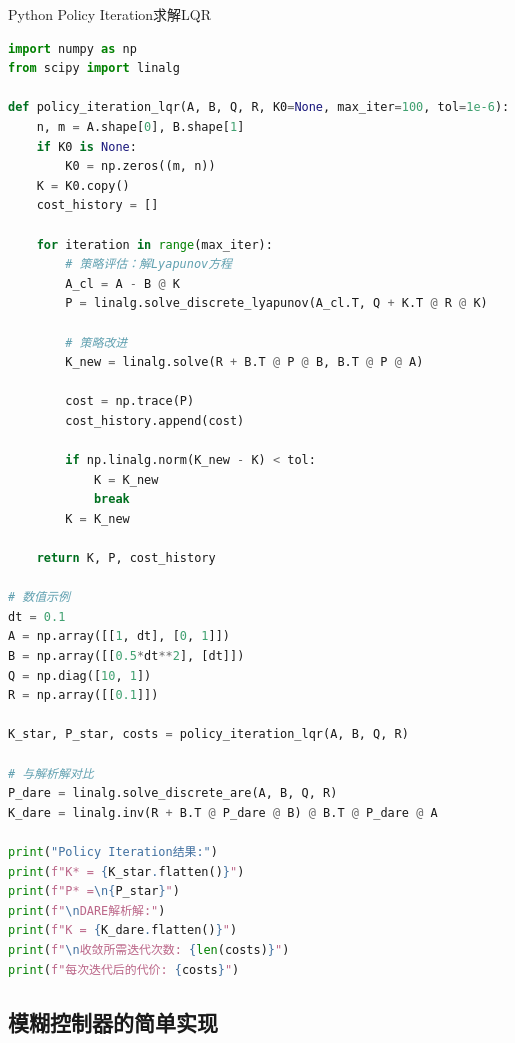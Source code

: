 \begin{mycode}{Python Policy Iteration求解LQR}
\begin{lstlisting}[language=Python]
import numpy as np
from scipy import linalg

def policy_iteration_lqr(A, B, Q, R, K0=None, max_iter=100, tol=1e-6):
    n, m = A.shape[0], B.shape[1]
    if K0 is None:
        K0 = np.zeros((m, n))
    K = K0.copy()
    cost_history = []
    
    for iteration in range(max_iter):
        # 策略评估：解Lyapunov方程
        A_cl = A - B @ K
        P = linalg.solve_discrete_lyapunov(A_cl.T, Q + K.T @ R @ K)
        
        # 策略改进
        K_new = linalg.solve(R + B.T @ P @ B, B.T @ P @ A)
        
        cost = np.trace(P)
        cost_history.append(cost)
        
        if np.linalg.norm(K_new - K) < tol:
            K = K_new
            break
        K = K_new
    
    return K, P, cost_history

# 数值示例
dt = 0.1
A = np.array([[1, dt], [0, 1]])
B = np.array([[0.5*dt**2], [dt]])
Q = np.diag([10, 1])
R = np.array([[0.1]])

K_star, P_star, costs = policy_iteration_lqr(A, B, Q, R)

# 与解析解对比
P_dare = linalg.solve_discrete_are(A, B, Q, R)
K_dare = linalg.inv(R + B.T @ P_dare @ B) @ B.T @ P_dare @ A

print("Policy Iteration结果:")
print(f"K* = {K_star.flatten()}")
print(f"P* =\n{P_star}")
print(f"\nDARE解析解:")
print(f"K = {K_dare.flatten()}")
print(f"\n收敛所需迭代次数: {len(costs)}")
print(f"每次迭代后的代价: {costs}")
\end{lstlisting}
\end{mycode}

\subsection{模糊控制器的简单实现}

